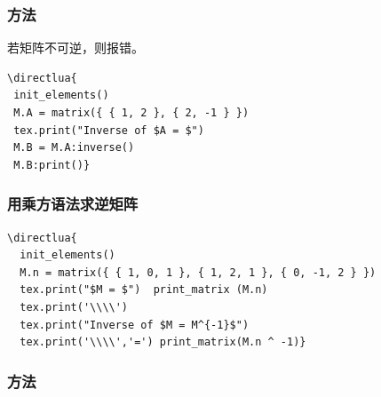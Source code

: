\subsubsection{方法 }
\label{ssub:inverse_matrix}

若矩阵不可逆，则报错。

\begin{minipage}{.6\textwidth}
\begin{verbatim}
\directlua{
 init_elements()
 M.A = matrix({ { 1, 2 }, { 2, -1 } })
 tex.print("Inverse of $A = $")
 M.B = M.A:inverse()
 M.B:print()}
\end{verbatim}
\end{minipage}
\begin{minipage}{.4\textwidth}
\end{minipage}

\subsubsection{用乘方语法求逆矩阵}
\label{ssub:inverse_matrix_with_power_syntax}

\begin{minipage}{.6\textwidth}
\begin{verbatim}
\directlua{
  init_elements()
  M.n = matrix({ { 1, 0, 1 }, { 1, 2, 1 }, { 0, -1, 2 } })
  tex.print("$M = $")  print_matrix (M.n)
  tex.print('\\\\')
  tex.print("Inverse of $M = M^{-1}$")
  tex.print('\\\\','=') print_matrix(M.n ^ -1)}
\end{verbatim}
\end{minipage}
\begin{minipage}{.4\textwidth}
\end{minipage}

\subsubsection{方法 }
\label{ssub:transpose_matrix}

